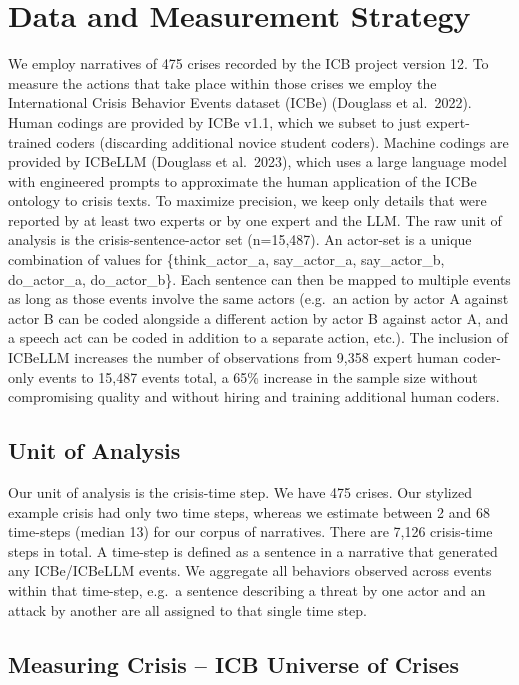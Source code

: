 \documentclass[
  letterpaper,
  DIV=11,
  numbers=noendperiod]{scrartcl}
\begin{document}
\section{Data and Measurement
Strategy}\label{data-and-measurement-strategy}

We employ narratives of 475 crises recorded by the ICB project version
12. To measure the actions that take place within those crises we employ
the International Crisis Behavior Events dataset (ICBe) (Douglass et
al.~2022). Human codings are provided by ICBe v1.1, which we subset to
just expert-trained coders (discarding additional novice student
coders). Machine codings are provided by ICBeLLM (Douglass et al.~2023),
which uses a large language model with engineered prompts to approximate
the human application of the ICBe ontology to crisis texts. To maximize
precision, we keep only details that were reported by at least two
experts or by one expert and the LLM. The raw unit of analysis is the
crisis-sentence-actor set (n=15,487). An actor-set is a unique
combination of values for \{think\_actor\_a, say\_actor\_a,
say\_actor\_b, do\_actor\_a, do\_actor\_b\}. Each sentence can then be
mapped to multiple events as long as those events involve the same
actors (e.g.~an action by actor A against actor B can be coded alongside
a different action by actor B against actor A, and a speech act can be
coded in addition to a separate action, etc.). The inclusion of ICBeLLM
increases the number of observations from 9,358 expert human coder-only
events to 15,487 events total, a 65\% increase in the sample size
without compromising quality and without hiring and training additional
human coders.

\subsection{Unit of Analysis}\label{unit-of-analysis}

Our unit of analysis is the crisis-time step. We have 475 crises. Our
stylized example crisis had only two time steps, whereas we estimate
between 2 and 68 time-steps (median 13) for our corpus of narratives.
There are 7,126 crisis-time steps in total. A time-step is defined as a
sentence in a narrative that generated any ICBe/ICBeLLM events. We
aggregate all behaviors observed across events within that time-step,
e.g.~a sentence describing a threat by one actor and an attack by
another are all assigned to that single time step.

\subsection{Measuring Crisis -- ICB Universe of
Crises}\label{measuring-crisis-icb-universe-of-crises}
\end{document}
